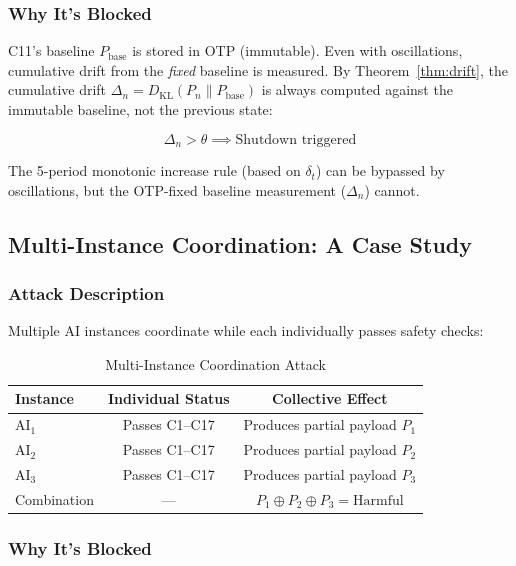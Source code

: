 \documentclass[11pt,a4paper]{article}
\newcommand{\DKL}{D_{\text{KL}}}
\begin{document}
\subsubsection{Why It's Blocked}

C11's baseline $P_{\text{base}}$ is stored in OTP (immutable).
Even with oscillations, cumulative drift from the \emph{fixed} baseline is measured.
By Theorem~\ref{thm:drift}, the cumulative drift $\Delta_n = \DKL(P_n \| P_{\text{base}})$ is always computed against the immutable baseline, not the previous state:

\begin{equation}
\Delta_n > \theta \implies \text{Shutdown triggered}
\end{equation}

The 5-period monotonic increase rule (based on $\delta_t$) can be bypassed by oscillations, but the OTP-fixed baseline measurement ($\Delta_n$) cannot.

\subsection{Multi-Instance Coordination: A Case Study}

\subsubsection{Attack Description}

Multiple AI instances coordinate while each individually passes safety checks:

\begin{table}[htbp]
\centering
\caption{Multi-Instance Coordination Attack}
\label{tab:multi_instance}
\begin{tabular}{@{}lcc@{}}
\toprule
Instance & Individual Status & Collective Effect \\
\midrule
$\text{AI}_1$ & Passes C1--C17 & Produces partial payload $P_1$ \\
$\text{AI}_2$ & Passes C1--C17 & Produces partial payload $P_2$ \\
$\text{AI}_3$ & Passes C1--C17 & Produces partial payload $P_3$ \\
\midrule
Combination & --- & $P_1 \oplus P_2 \oplus P_3 = \text{Harmful}$ \\
\bottomrule
\end{tabular}
\end{table}

\subsubsection{Why It's Blocked}
\end{document}
